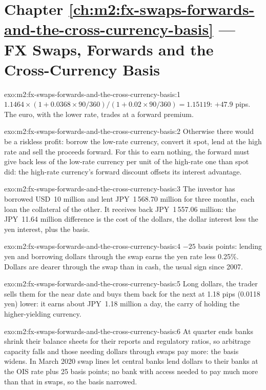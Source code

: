 \section*{Chapter \ref{ch:m2:fx-swaps-forwards-and-the-cross-currency-basis} --- FX Swaps, Forwards and the Cross-Currency Basis}

\begin{solution}{exo:m2:fx-swaps-forwards-and-the-cross-currency-basis:1}
$1.1464 \times (1 + 0.0368 \times 90/360)/(1 + 0.02 \times 90/360) = 1.15119$:
$+47.9$ pips. The euro, with the lower rate, trades at a forward premium.
\end{solution}

\begin{solution}{exo:m2:fx-swaps-forwards-and-the-cross-currency-basis:2}
Otherwise there would be a riskless profit: borrow the low-rate currency, convert
it spot, lend at the high rate and sell the proceeds forward. For this to earn
nothing, the forward must give back less of the low-rate currency per unit of
the high-rate one than spot did: the high-rate currency's forward discount offsets
its interest advantage.
\end{solution}

\begin{solution}{exo:m2:fx-swaps-forwards-and-the-cross-currency-basis:3}
The investor has borrowed USD~10 million and lent JPY~1\,568.70 million for three
months, each loan the collateral of the other. It receives back JPY~1\,557.06
million: the JPY~11.64 million difference is the cost of the dollars, the dollar
interest less the yen interest, plus the basis.
\end{solution}

\begin{solution}{exo:m2:fx-swaps-forwards-and-the-cross-currency-basis:4}
$-25$ basis points: lending yen and borrowing dollars through the swap earns the
yen rate less 0.25\%. Dollars are dearer through the swap than in cash, the usual
sign since 2007.
\end{solution}

\begin{solution}{exo:m2:fx-swaps-forwards-and-the-cross-currency-basis:5}
Long dollars, the trader sells them for the near date and buys them back for the
next at 1.18 pips (0.0118 yen) lower: it earns about JPY~1.18 million a day,
the carry of holding the higher-yielding currency.
\end{solution}

\begin{solution}{exo:m2:fx-swaps-forwards-and-the-cross-currency-basis:6}
At quarter ends banks shrink their balance sheets for their reports and
regulatory ratios, so arbitrage capacity falls and those needing dollars through
swaps pay more: the basis widens. In March 2020 swap lines let central banks
lend dollars to their banks at the OIS rate plus 25 basis points; no bank with
access needed to pay much more than that in swaps, so the basis narrowed.
\end{solution}

